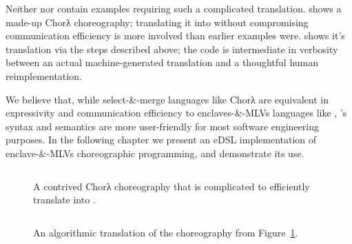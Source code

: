 Neither \cite{chor-lambda} nor \cite{chor-lambda-2} contain examples requiring such a complicated translation.
 shows a made-up Chorλ choreography;
translating it into \HLSCentral without compromising communication efficiency is more involved than earlier examples were.
 shows it's translation via the steps described above;
the code is intermediate in verbosity between an actual machine-generated translation
and a thoughtful human reimplementation.

We believe that, while select-\&-merge languages like Chorλ are equivalent
in expressivity and communication efficiency to enclaves-\&-MLVs languages like \HLSCentral,
\HLSCentral's syntax and semantics are more user-friendly for most software engineering purposes.
In the following chapter we present an eDSL implementation of enclave-\&-MLVs choreographic programming,
and demonstrate its use.

\begin{figure}[tbhp]
    \begin{mdframed}
    \inputminted[xleftmargin=10pt,linenos,fontsize=\scriptsize]{bash}{figures/contrived_lc.txt}
    \caption{A contrived Chorλ choreography that is complicated to efficiently translate into \HLSCentral.}
    \label{fig:chor-lambda-complex}
    \end{mdframed}
\end{figure}

\begin{figure}[tbhp]
    \begin{mdframed}
    \inputminted[xleftmargin=10pt,linenos,fontsize=\scriptsize]{bash}{figures/contrived_hls.txt}
    \caption{An algorithmic \HLSCentral translation of the choreography from Figure~\ref{fig:chor-lambda-complex}.}
    \label{fig:our-complex}
    \end{mdframed}
\end{figure}




